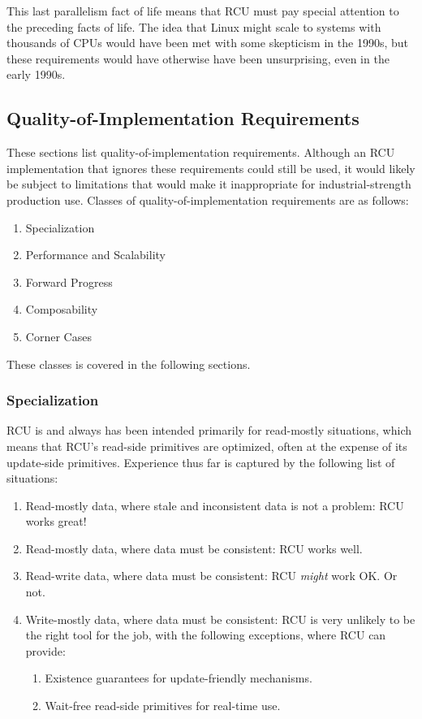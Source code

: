This last parallelism fact of life means that RCU must pay special
attention to the preceding facts of life.
The idea that Linux might
scale to systems with thousands of CPUs would have been met with some
skepticism in the 1990s, but these requirements would have otherwise
have been unsurprising, even in the early 1990s.


\subsection{Quality-of-Implementation Requirements}

These sections list quality-of-implementation requirements.
Although an
RCU implementation that ignores these requirements could still be used,
it would likely be subject to limitations that would make it
inappropriate for industrial-strength production use.
Classes of
quality-of-implementation requirements are as follows:

\begin{enumerate}
\item Specialization
\item Performance and Scalability
\item Forward Progress
\item Composability
\item Corner Cases
\end{enumerate}

These classes is covered in the following sections.


\subsubsection{Specialization}

RCU is and always has been intended primarily for read-mostly
situations, which means that RCU's read-side primitives are optimized,
often at the expense of its update-side primitives.
Experience thus far
is captured by the following list of situations:

\begin{enumerate}
\item Read-mostly data, where stale and inconsistent data is not a problem:
   RCU works great!
\item Read-mostly data, where data must be consistent: RCU works well.
\item Read-write data, where data must be consistent: RCU \emph{might} work OK.
   Or not.
\item Write-mostly data, where data must be consistent: RCU is very
   unlikely to be the right tool for the job, with the following
   exceptions, where RCU can provide:

   \begin{enumerate}
   \item Existence guarantees for update-friendly mechanisms.
   \item Wait-free read-side primitives for real-time use.
   \end{enumerate}
\end{enumerate}

